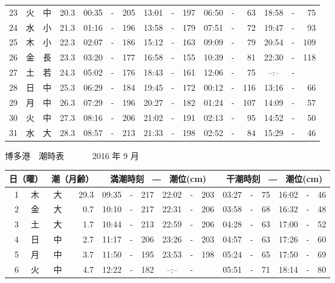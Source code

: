 \documentclass[12pt.a4j]{jsarticle}
\begin{document}
\begin{center}
\begin{table}[ht]
\begin{tabular}{|rc|cr|ccrccr|ccrccr|}
23 & 火 & 中 & 20.3 &  00:35 &-& 205  &  13:01 &-& 197  &   06:50 &-&  63  &   18:58 &-&  75  \\
24 & 水 & 小 & 21.3 &  01:16 &-& 196  &  13:58 &-& 179  &   07:51 &-&  72  &   19:47 &-&  93  \\
25 & 木 & 小 & 22.3 &  02:07 &-& 186  &  15:12 &-& 163  &   09:09 &-&  79  &   20:54 &-& 109  \\
26 & 金 & 長 & 23.3 &  03:20 &-& 177  &  16:58 &-& 155  &   10:39 &-&  81  &   22:30 &-& 118  \\
27 & 土 & 若 & 24.3 &  05:02 &-& 176  &  18:43 &-& 161  &   12:06 &-&  75  &   --:-- &-&     \\
28 & 日 & 中 & 25.3 &  06:29 &-& 184  &  19:45 &-& 172  &   00:12 &-& 116  &   13:16 &-&  66  \\
29 & 月 & 中 & 26.3 &  07:29 &-& 196  &  20:27 &-& 182  &   01:24 &-& 107  &   14:09 &-&  57  \\
30 & 火 & 中 & 27.3 &  08:16 &-& 206  &  21:02 &-& 191  &   02:13 &-&  95  &   14:52 &-&  50  \\
31 & 水 & 大 & 28.3 &  08:57 &-& 213  &  21:33 &-& 198  &   02:52 &-&  84  &   15:29 &-&  46  \\
   \hline
   \end{tabular}
\end{table}
\newpage
 {\LARGE 博多港　潮時表　　　}
 {\large 2016 年  9 月}\\
 \begin{table}[ht]
    \begin{tabular}{|rc|cr|ccrccr|ccrccr|}
    \hline
    \multicolumn{2}{|c|}{日（曜）} & \multicolumn{2}{c|}{潮（月齢）} & \multicolumn{6}{c|}{満潮時刻　―　潮位(cm)} & \multicolumn{6}{c|}{干潮時刻　―　潮位(cm)} \\
 \hline
 1 & 木 & 大 & 29.3 &  09:35 &-& 217  &  22:02 &-& 203  &   03:27 &-&  75  &   16:02 &-&  46  \\
 2 & 金 & 大 &  0.7 &  10:10 &-& 217  &  22:31 &-& 206  &   03:58 &-&  68  &   16:32 &-&  48  \\
 3 & 土 & 大 &  1.7 &  10:44 &-& 213  &  22:59 &-& 206  &   04:28 &-&  63  &   17:00 &-&  52  \\
 4 & 日 & 中 &  2.7 &  11:17 &-& 206  &  23:26 &-& 203  &   04:57 &-&  63  &   17:26 &-&  60  \\
 5 & 月 & 中 &  3.7 &  11:50 &-& 195  &  23:53 &-& 198  &   05:24 &-&  65  &   17:50 &-&  69  \\
 6 & 火 & 中 &  4.7 &  12:22 &-& 182  &  --:-- &-&     &   05:51 &-&  71  &   18:14 &-&  80  \\

\end{tabular}
\end{table}
\end{center}
\end{document}
